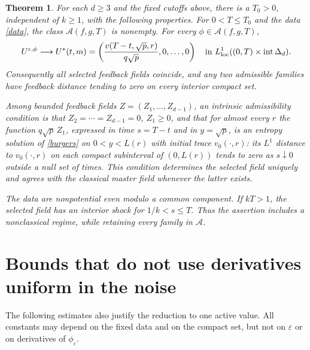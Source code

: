 \documentclass[11pt]{article}
\newtheorem{theorem}{Theorem}
\newcommand{\eps}{\varepsilon}
\newcommand{\cA}{\mathcal A}
\begin{document}
\begin{theorem}\label{main}
For each $d\ge3$ and the fixed cutoffs above, there is a $T_0>0$, independent of $k\ge1$, with the following properties. For $0<T\le T_0$ and the data \eqref{data}, the class $\cA(f,g,T)$ is nonempty. For every $\phi\in\cA(f,g,T)$,
\begin{equation}\label{convergence}
 U^{\eps,\phi}\longrightarrow
 U^*(t,m)=\left(\frac{v(T-t,\sqrt p,r)}{q\sqrt p},0,\ldots,0\right)
 \quad\text{in }L^1_{\rm loc}((0,T)\times\operatorname{int}\Delta_d).
\end{equation}
Consequently all selected feedback fields coincide, and any two admissible families have feedback distance tending to zero on every interior compact set.

Among bounded feedback fields $Z=(Z_1,\ldots,Z_{d-1})$, an intrinsic admissibility condition is that $Z_2=\cdots=Z_{d-1}=0$, $Z_1\ge0$, and that for almost every $r$ the function $q\sqrt p\,Z_1$, expressed in time $s=T-t$ and in $y=\sqrt p$, is an entropy solution of \eqref{burgers} on $0<y<L(r)$ with initial trace $v_0(\cdot,r)$: its $L^1$ distance to $v_0(\cdot,r)$ on each compact subinterval of $(0,L(r))$ tends to zero as $s\downarrow0$ outside a null set of times. This condition determines the selected field uniquely and agrees with the classical master field whenever the latter exists.

The data are nonpotential even modulo a common component. If $kT>1$, the selected field has an interior shock for $1/k<s\le T$. Thus the assertion includes a nonclassical regime, while retaining every family in $\cA$.
\end{theorem}

\section{Bounds that do not use derivatives uniform in the noise}
The following estimates also justify the reduction to one active value. All constants may depend on the fixed data and on the compact set, but not on $\eps$ or on derivatives of $\phi_\eps$.
\end{document}
